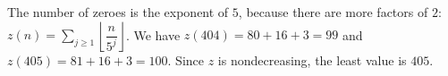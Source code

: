 The number of zeroes is the exponent of $5$, because there are more factors of $2$: $z(n)=\sum_{j\ge1}\left\lfloor\dfrac{n}{5^j}\right\rfloor$. We have $z(404)=80+16+3=99$ and $z(405)=81+16+3=100$. Since $z$ is nondecreasing, the least value is $\boxed{405}$.
